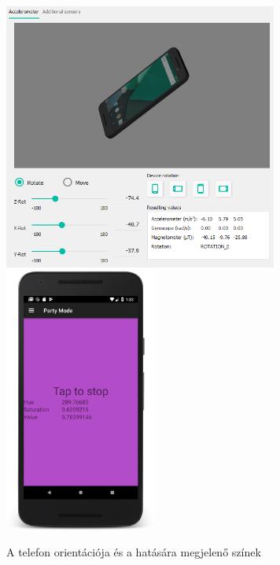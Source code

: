 \documentclass[../main.tex]{subfiles}
\begin{document}
\begin{figure}[h!]
                    \includegraphics[width=9cm]{android_res/screen_pictures/phone_orientation_02}
                    \includegraphics[width=5cm]{android_res/screen_pictures/phone_orientation_22}
                \caption{A telefon orientációja és a hatására megjelenő színek}
                \label{fig:party_mode}
            \end{figure}
            
\end{document}
